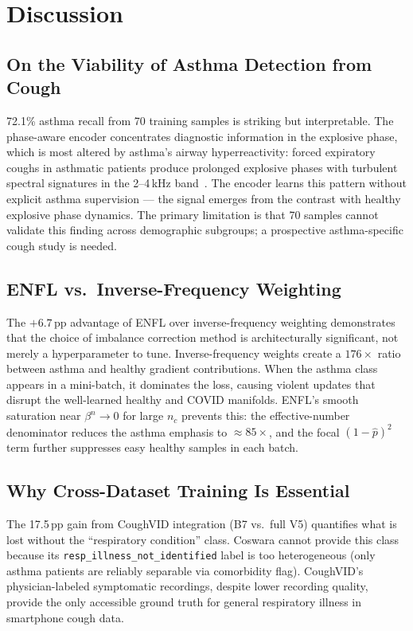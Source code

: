 \documentclass[journal]{IEEEtran}
\begin{document}
\section{Discussion}
\label{sec:discussion}

\subsection{On the Viability of Asthma Detection from Cough}

72.1\% asthma recall from 70 training samples is striking but
interpretable. The phase-aware encoder concentrates diagnostic information
in the explosive phase, which is most altered by asthma's airway
hyperreactivity: forced expiratory coughs in asthmatic patients produce
prolonged explosive phases with turbulent spectral signatures in the
2--4\,kHz band~\cite{asthma_acoustics}. The encoder learns this
pattern without explicit asthma supervision — the signal emerges from
the contrast with healthy explosive phase dynamics. The primary
limitation is that 70 samples cannot validate this finding across
demographic subgroups; a prospective asthma-specific cough study is needed.

\subsection{ENFL vs.\ Inverse-Frequency Weighting}

The $+6.7$\,pp advantage of ENFL over inverse-frequency weighting
demonstrates that the choice of imbalance correction method is
architecturally significant, not merely a hyperparameter to tune.
Inverse-frequency weights create a $176{\times}$ ratio between
asthma and healthy gradient contributions. When the asthma class
appears in a mini-batch, it dominates the loss, causing violent
updates that disrupt the well-learned healthy and COVID manifolds.
ENFL's smooth saturation near $\beta^n\to 0$ for large $n_c$
prevents this: the effective-number denominator reduces the asthma
emphasis to $\approx 85{\times}$, and the focal $(1-\hat{p})^2$
term further suppresses easy healthy samples in each batch.

\subsection{Why Cross-Dataset Training Is Essential}

The 17.5\,pp gain from CoughVID integration (B7 vs.\ full V5)
quantifies what is lost without the ``respiratory condition'' class.
Coswara cannot provide this class because its \texttt{resp\_illness\_not\_identified}
label is too heterogeneous (only asthma patients are reliably
separable via comorbidity flag). CoughVID's physician-labeled symptomatic
recordings, despite lower recording quality, provide the only
accessible ground truth for general respiratory illness in smartphone
cough data.
\end{document}
